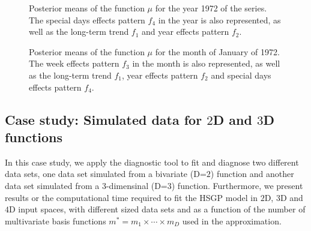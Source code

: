 \begin{figure}%
\centering
{}
\caption{Posterior means of the function $\mu$ for the year 1972 of the series. The special days effects pattern $f_4$ in the year is also represented, as well as the long-term trend $f_1$ and year effects pattern $f_2$. }
  \label{fig16_posteriors_oneyear_birthday}
\end{figure}

\begin{figure}%
\centering
{}
\caption{Posterior means of the function $\mu$ for the month of January of 1972. The week effects pattern $f_3$ in the month is also represented, as well as the long-term trend $f_1$, year effects pattern $f_2$ and special days effects pattern $f_4$. }
  \label{fig17_posteriors_onemonth_birthday}
\end{figure}

\subsection{Case study: Simulated data for $2$D and $3$D functions}\label{sec_caseIII}

In this case study, we apply the diagnostic tool to fit and diagnose two different data sets, one data set simulated from a bivariate (D=$2$) function and another data set simulated from a $3$-dimensinal (D=$3$) function. Furthermore, we present results or the computational time required to fit the HSGP model in $2$D, $3$D and $4$D input spaces, with different sized data sets and as a function of the number of multivariate basis functions $m^*=m_1\times \cdots \times m_D$ used in the approximation.

